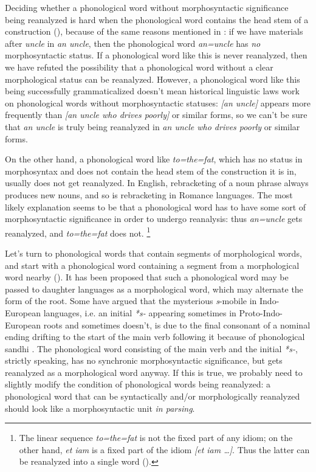 \documentclass[a4paper, oneside, scheme=plain, 12pt]{article}
\newcommand*{\citepage}[1]{p.~{#1}}
\newcommand{\form}[1]{\emph{#1}}
\begin{document}
Deciding whether a phonological word without morphosyntactic significance being reanalyzed is hard
when the phonological word contains the head stem of a construction (),
because of the same reasons mentioned in :
if we have materials after \form{uncle} in \form{an uncle},
then the phonological word \form{an=uncle} has \emph{no} morphosyntactic status.
If a phonological word like this is never reanalyzed,
then we have refuted the possibility that a phonological word without a clear morphological status can be reanalyzed.
However, a phonological word like this being successfully grammaticalized
doesn't mean historical linguistic laws work on phonological words without morphosyntactic statuses:
\form{[an uncle]} appears more frequently than \form{[an uncle who drives poorly]} or similar forms,
so we can't be sure that \form{an uncle} is truly being reanalyzed in \form{an uncle who drives poorly} or similar forms.

On the other hand, a phonological word like \form{to=the=fat}, which has no status in morphosyntax
and does not contain the head stem of the construction it is in,
usually does not get reanalyzed.
In English, rebracketing of a noun phrase always produces new nouns,
and so is rebracketing in Romance languages.
The most likely explanation seems to be that
a phonological word has to have some sort of morphosyntactic significance in order to undergo reanalysis:
thus \form{an=uncle} gets reanalyzed, and \form{to=the=fat} does not.%
\footnote{
    The linear sequence \form{to=the=fat} is not the fixed part of any idiom;
    on the other hand, \form{et iam} is a fixed part of the idiom \form{[et iam \dots]}.
    Thus the latter can be reanalyzed into a single word ().
}

Let's turn to phonological words that contain segments of morphological words,
and start with a phonological word containing a segment from a morphological word nearby
().
It has been proposed that such a phonological word
may be passed to daughter languages as a morphological word,
which may alternate the form of the root.
Some have argued that the mysterious \form{s}-mobile in Indo-European languages,
i.e. an initial \form{*s-} appearing sometimes in Proto-Indo-European roots and sometimes doesn't,
is due to the final consonant of a nominal ending drifting to the start of the main verb following it
because of phonological sandhi \citep[\citepage{169}]{sihler1995new}.
The phonological word consisting of the main verb and the initial \form{*s-},
strictly speaking, has no synchronic morphosyntactic significance,
but gets reanalyzed as a morphological word anyway.
If this is true, we probably need to slightly modify the condition of phonological words being reanalyzed:
a phonological word that can be syntactically and/or morphologically reanalyzed
should look like a morphosyntactic unit \emph{in parsing}.
\end{document}
